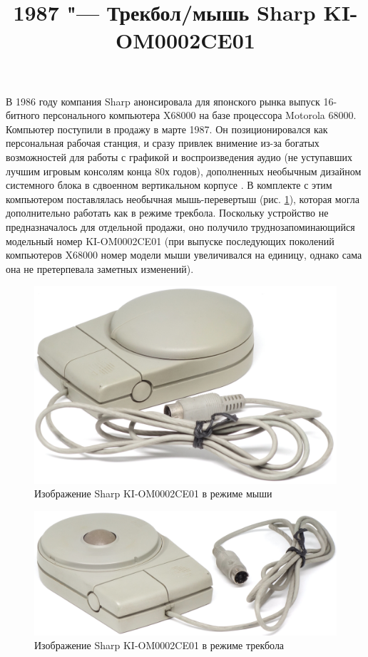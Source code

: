 \documentclass[11pt, a4paper]{article}
\begin{document}
\title{1987 "--- Трекбол/мышь Sharp KI-OM0002CE01}
\date{}
\maketitle
{}

В 1986 году компания Sharp анонсировала для японского рынка выпуск 16-битного персонального компьютера  X68000 на базе процессора Motorola 68000. Компьютер поступили в продажу в марте 1987. Он позиционировался как персональная рабочая станция, и сразу привлек внимение из-за богатых возможностей для работы с графикой и воспроизведения аудио (не уступавших лучшим игровым консолям конца 80х годов), дополненных необычным дизайном системного блока в сдвоенном вертикальном корпусе \cite{museum}. В комплекте с этим компьютером поставлялась необычная мышь-перевертыш (рис. \ref{fig:SharpConvertibleMouse}), которая могла дополнительно работать как в режиме трекбола. Поскольку устройство не предназначалось для отдельной продажи, оно получило труднозапоминающийся модельный номер KI-OM0002CE01 (при выпуске последующих поколений компьютеров X68000 номер модели мыши увеличивался на единицу, однако сама она не претерпевала заметных изменений).

\begin{figure}[h]
    \centering
    \includegraphics[scale=0.65]{1987_sharp_convertible/picmouse_60}
    \caption{Изображение Sharp KI-OM0002CE01 в режиме мыши}
    \label{fig:SharpConvertibleMouse}
\end{figure}

\begin{figure}[h]
    \centering
    \includegraphics[scale=0.65]{1987_sharp_convertible/picball_60}
    \caption{Изображение Sharp KI-OM0002CE01 в режиме трекбола}
    \label{fig:SharpConvertibleTrackball}
\end{figure}
\end{document}
